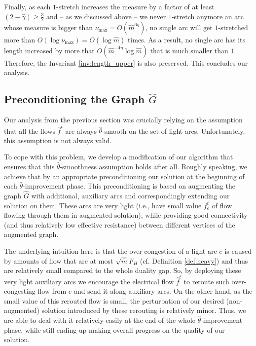 \documentclass[11pt, letterpaper]{article}
\newcommand{\fheavy}{F_{H}}
\newcommand{\hG}{\widehat{G}}
\newcommand{\hm}{\widehat{m}}
\newcommand{\hgamma}{\hat{\gamma}}
\newcommand{\htheta}{\hat{\theta}}
\newcommand{\hff}{\boldsymbol{\mathit{\hat{f}}}}
\begin{document}
Finally, as each $1$-stretch increases the measure by a factor of at least $(2-\hgamma)\geq \frac{3}{2}$ and -- as we discussed above -- we never $1$-stretch anymore an arc whose measure is bigger than $\nu_{\max}=O(\hm^{6\eta})$, no single arc will get $1$-stretched more than $O(\log \nu_{\max})=O(\log \hm)$ times. As a result, no single arc has its length increased by more that $O(\hm^{-4\eta}\log \hm)$ that is much smaller than $1$. Therefore, the Invariant \ref{inv:length_upper} is also preserved. This concludes our analysis. 
 

\subsection{Preconditioning the Graph \texorpdfstring{$\hG$}{G}}\label{sec:preconditioning}


Our analysis from the previous section was crucially relying on the assumption that all the flows $\hff^t$ are always $\htheta$-smooth on the set of light arcs. Unfortunately, this assumption is not always valid. 

To cope with this problem, we develop a modification of our algorithm that ensures that this $\htheta$-smoothness assumption holds after all. Roughly speaking, we achieve that by an appropriate preconditioning our solution at the beginning of each $\htheta$-improvement phase. This preconditioning is based on augmenting the graph $\hG$ with additional, auxiliary arcs and correspondingly extending our solution on them. These arcs are very light (i.e., have small value $f_e^t$ of flow flowing through them in augmented solution), while providing good connectivity (and thus relatively low effective resistance) between different vertices of the augmented graph. 

The underlying intuition here is that the over-congestion of a light arc $e$ is caused by amounts of flow that are at most $\sqrt{\hm}\fheavy$ (cf. Definition \eqref{def:heavy}) and thus are relatively small compared to the whole duality gap. So, by deploying these very light auxiliary arcs we encourage the electrical flow $\hff^t$ to reroute such over-congesting flow from $e$ and send it along auxiliary arcs. On the other hand. as the small value of this rerouted flow is small, the perturbation of our desired (non-augmented) solution introduced by these rerouting is relatively minor. Thus, we are able to deal with it relatively easily at the end of the whole $\htheta$-improvement phase, while still ending up making overall progress on the quality of our solution. 
\end{document}
